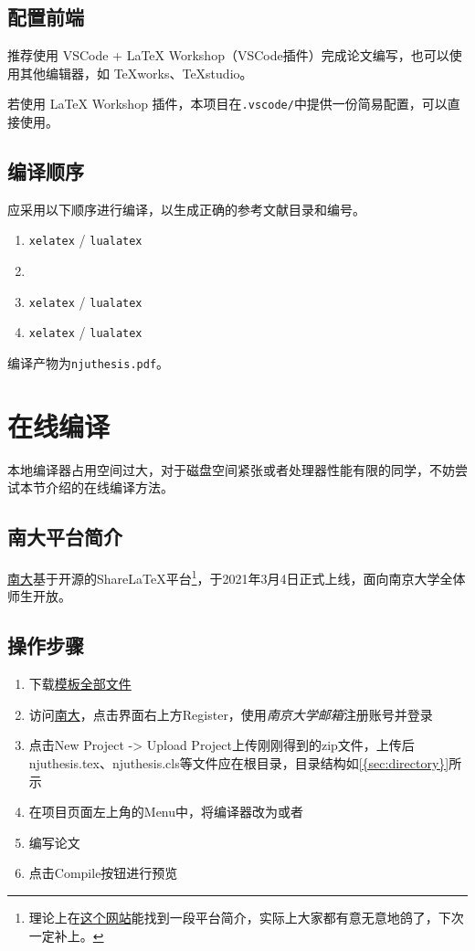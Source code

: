 \subsection{配置前端}

推荐使用 VSCode + LaTeX Workshop（VSCode插件）完成论文编写，也可以使用其他编辑器，如 TeXworks、TeXstudio。

若使用 LaTeX Workshop 插件，本项目在\lstinline|.vscode/|中提供一份简易配置，可以直接使用。

\subsection{编译顺序}
应采用以下顺序进行编译，以生成正确的参考文献目录和编号。
\begin{enumerate}
    \item \lstinline|xelatex| / \lstinline|lualatex|
    \item {}
    \item \lstinline|xelatex| / \lstinline|lualatex|
    \item \lstinline|xelatex| / \lstinline|lualatex|
\end{enumerate}

编译产物为\lstinline|njuthesis.pdf|。

\section{在线编译}

本地编译器占用空间过大，对于磁盘空间紧张或者处理器性能有限的同学，不妨尝试本节介绍的在线编译方法。

\subsection{南大平台简介}

\href{https://tex.nju.edu.cn}{南大}基于开源的ShareLaTeX平台\footnote{理论上在\href{https://doc.nju.edu.cn/books/latex}{这个网站}能找到一段平台简介，实际上大家都有意无意地鸽了，下次一定补上。}，于2021年3月4日正式上线，面向南京大学全体师生开放。

\subsection{操作步骤}

\begin{enumerate}
    \item 下载\href{https://github.com/nju-lug/NJUThesisUndergraduate/archive/refs/heads/master.zip}{模板全部文件}
    \item 访问\href{https://tex.nju.edu.cn}{南大}，点击界面右上方Register，使用\emph{南京大学邮箱}注册账号并登录
    \item 点击New Project -> Upload Project上传刚刚得到的zip文件，上传后njuthesis.tex、njuthesis.cls等文件应在根目录，目录结构如\cref{{sec:directory}}所示
    \item 在项目页面左上角的Menu中，将编译器改为或者
    \item 编写论文
    \item 点击Compile按钮进行预览
\end{enumerate}

